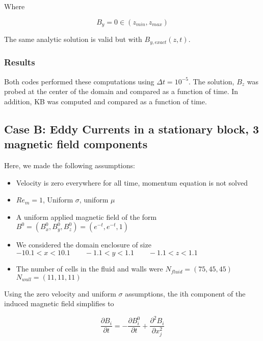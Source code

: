 \documentclass[11pt]{article}
\newcommand{\figS}{22.1em}
\newcommand{\figH}{\figS}
\newcommand{\figW}{\figS}
\begin{document}
Where

\begin{equation}
	B_y = 0
	\in (z_{min}, z_{max})
\end{equation}

The same analytic solution is valid but with $B_{y,exact}(z,t)$.

\subsubsection{Results}
Both codes performed these computations using $\Delta t = 10^{-5}$. The solution, $B_z$ was probed at the center of the domain and compared as a function of time. In addition, KB was computed and compared as a function of time. 

\begin{figure}[H]
 \centering
   \caption[Optional ]{}
\end{figure}

\subsection{Case B: Eddy Currents in a stationary block, 3 magnetic field components}
Here, we made the following assumptions:

\begin{itemize}
\item Velocity is zero everywhere for all time, momentum equation is not solved
\item $Re_m = 1$, Uniform $\sigma$, uniform $\mu$
\item A uniform applied magnetic field of the form $B^0 = (B_x^0,B_y^0,B_z^0) = (e^{-t},e^{-t},1)$
\item We considered the domain enclosure of size $-10.1 < x < 10.1 \qquad -1.1 < y < 1.1 \qquad -1.1 < z < 1.1$
\item The number of cells in the fluid and walls were $N_{fluid} = (75,45,45)$ \qquad $N_{wall} = (11,11,11)$
\end{itemize}

Using the zero velocity and uniform $\sigma$ assumptions, the ith component of the induced magnetic field simplifies to

\begin{equation}
	\frac{\partial B_i}{\partial t} 
	=
	-
	\frac{\partial B_i^0}{\partial t}
	+
	\frac{\partial^2 B_i}{\partial x_j^2} 
\end{equation}
\end{document}
